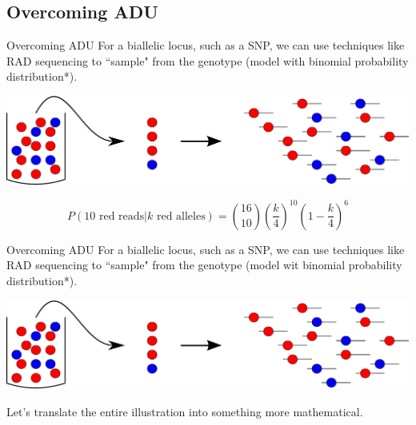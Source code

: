 \documentclass[presentation]{beamer}
\begin{document}
\subsection{Overcoming ADU}

\begin{frame}[t]{Overcoming ADU}
	For a biallelic locus, such as a SNP, we can use techniques like RAD sequencing to ``sample" from the genotype (model with binomial probability distribution*).
	\vspace{0.2in}
	
	\begin{center}
		\includegraphics[width=\textwidth]{fig/pop-gen-model-empty}
	\end{center}
	
	\pause
	\begin{equation*}
	P(10 \text{ red reads}|k \text{ red alleles}) = \binom{16}{10}\left(\frac{k}{4}\right)^{10}\left(1-\frac{k}{4}\right)^6
	\end{equation*}
	
\end{frame}

\begin{frame}[t]{Overcoming ADU}
	For a biallelic locus, such as a SNP, we can use techniques like RAD sequencing to ``sample" from the genotype (model wit binomial probability distribution*).
	\vspace{0.2in}
	
	\begin{center}
		\includegraphics[width=\textwidth]{fig/pop-gen-model-empty}
	\end{center}

	\vspace{0.1in}
	Let's translate the entire illustration into something more mathematical.
\end{frame}
\end{document}
